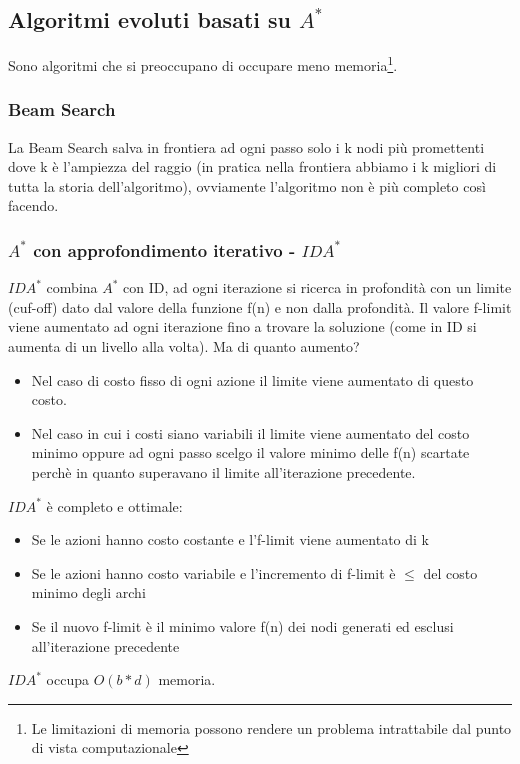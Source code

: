 \documentclass{article}
\begin{document}
\subsection{Algoritmi evoluti basati su $A^*$}
Sono algoritmi che si preoccupano di occupare meno memoria\footnote{Le limitazioni di memoria possono rendere un problema intrattabile dal punto di vista computazionale}.
\subsubsection{Beam Search}
La Beam Search salva in frontiera ad ogni passo solo i k nodi più promettenti dove k è l'ampiezza del raggio (in pratica nella frontiera abbiamo i k migliori di tutta la storia dell'algoritmo), ovviamente l'algoritmo non è più completo così facendo.

\subsubsection{$A^*$ con approfondimento iterativo - $IDA^*$}
$IDA^*$ combina $A^*$ con ID, ad ogni iterazione si ricerca in profondità con un limite (cuf-off) dato dal valore della funzione f(n) e non dalla profondità. Il valore f-limit viene aumentato ad ogni iterazione fino a trovare la soluzione (come in ID si aumenta di un livello alla volta). Ma di quanto aumento? 
\begin{itemize}
    \item Nel caso di costo fisso di ogni azione il limite viene aumentato di questo costo.
    \item Nel caso in cui i costi siano variabili il limite viene aumentato del costo minimo oppure ad ogni passo scelgo il valore minimo delle f(n) scartate perchè in quanto superavano il limite all'iterazione precedente.
\end{itemize}
$IDA^*$ è completo e ottimale:
\begin{itemize}
    \item Se le azioni hanno costo costante e l'f-limit viene aumentato di k
    \item Se le azioni hanno costo variabile e l'incremento di f-limit è $\leq$ del costo minimo degli archi
    \item Se il nuovo f-limit è il minimo valore f(n) dei nodi generati ed esclusi all'iterazione precedente
\end{itemize}
$IDA^*$ occupa $O(b*d)$ memoria.
\end{document}

